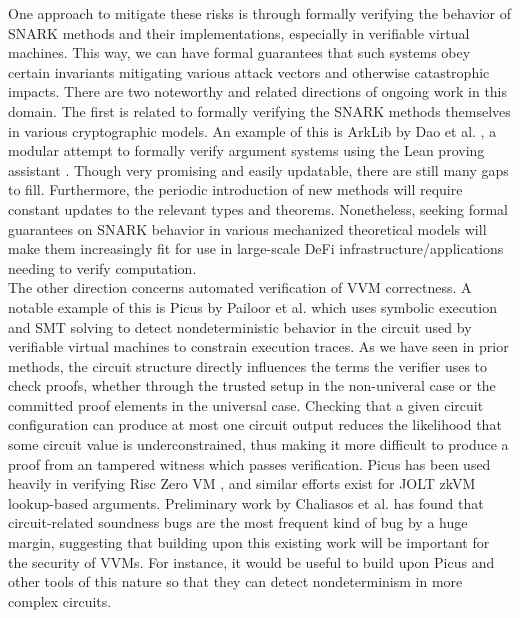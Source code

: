 \noindent One approach to mitigate these risks is through formally verifying the behavior of SNARK methods and their implementations, especially in verifiable virtual machines. This way, we can have formal guarantees that such systems obey certain invariants mitigating various attack vectors and otherwise catastrophic impacts. There are two noteworthy and related directions of ongoing work in this domain. The first is related to formally verifying the SNARK methods themselves in various cryptographic models. An example of this is ArkLib by Dao et al. \cite{arklib}, a modular attempt to formally verify argument systems using the Lean proving assistant \cite{lean4}. Though very promising and easily updatable, there are still many gaps to fill. Furthermore, the periodic introduction of new methods will require constant updates to the relevant types and theorems. Nonetheless, seeking formal guarantees on SNARK behavior in various mechanized theoretical models will make them increasingly fit for use in large-scale DeFi infrastructure/applications needing to verify computation. \\

\noindent The other direction concerns automated verification of VVM correctness. A notable example of this is Picus by Pailoor et al. \cite{picus} which uses symbolic execution and SMT solving to detect nondeterministic behavior in the circuit used by verifiable virtual machines to constrain execution traces. As we have seen in prior methods, the circuit structure directly influences the terms the verifier uses to check proofs, whether through the trusted setup in the non-univeral case or the committed proof elements in the universal case. Checking that a given circuit configuration can produce at most one circuit output reduces the likelihood that some circuit value is underconstrained, thus making it more difficult to produce a proof from an tampered witness which passes verification. Picus has been used heavily in verifying Risc Zero VM \cite{risc0}, and similar efforts exist for JOLT zkVM \cite{jolt, joltfv} lookup-based arguments. Preliminary work by Chaliasos et al. \cite{sok} has found that circuit-related soundness bugs are the most frequent kind of bug by a huge margin, suggesting that building upon this existing work will be important for the security of VVMs. For instance, it would be useful to build upon Picus and other tools of this nature so that they can detect nondeterminism in more complex circuits.

%


